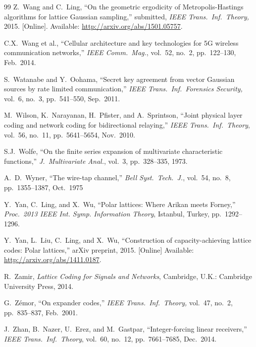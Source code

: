 \documentclass[main.tex]{subfiles}
\begin{document}
\begin{thebibliography}{99}
Z.\ Wang and C.\ Ling, ``On the geometric ergodicity of Metropolis-Hastings algorithms for lattice Gaussian sampling,'' submitted, \emph{IEEE Trans.\ Inf.\ Theory,} 2015. [Online]. Available: \url{http://arxiv.org/abs/1501.05757}.

C.X.\ Wang et al., ``Cellular architecture and key technologies for 5G wireless communication networks,'' \emph{IEEE Comm.\ Mag.}, vol.\ 52, no.\ 2, pp.\ 122--130, Feb.\ 2014.

 S.\ Watanabe and Y.\ Oohama, ``Secret key agreement from vector Gaussian sources by rate limited communication,'' 
 \emph{IEEE Trans.\ Inf.\ Forensics Security,} vol.\ 6, no.\ 3, pp.\ 541--550, Sep.\ 2011.

M.~Wilson, K.~Narayanan, H.~Pfister, and A.~Sprintson, ``Joint physical layer
  coding and network coding for bidirectional relaying,'' 
\emph{IEEE Trans.\ Inf.\ Theory}, vol.~56, no.~11, pp.\ 5641--5654, Nov.\ 2010.

S.J.~Wolfe, ``On the finite series expansion of multivariate characteristic functions,'' 
\emph{J.~Multivariate Anal.}, vol.\ 3, pp.\ 328--335, 1973.

A.~D.~Wyner, ``The wire-tap channel,'' \emph{Bell Syst.\ Tech.\ J.}, vol.~54, no.~8, pp.~1355--1387, Oct.\ 1975

Y.~Yan, C.~Ling, and X.~Wu, ``Polar lattices: Where Arikan meets Forney,''  \emph{Proc.\ 2013 IEEE Int. Symp. Information Theory}, Istanbul, Turkey, pp.\ 1292--1296.

Y.~Yan, L.~Liu, C.~Ling, and X.~Wu, ``Construction of capacity-achieving lattice codes: Polar lattices,''
arXiv preprint, 2015. [Online] Available: \url{http://arxiv.org/abs/1411.0187}.

  R.\ Zamir, \emph{Lattice Coding for Signals and Networks}, Cambridge, U.K.: Cambridge University Press, 2014.
  
G.\ Z\'{e}mor, ``On expander codes,'' \emph{IEEE Trans.\ Inf.\ Theory,} vol.\ 47, no.\ 2, pp.\ 835--837, Feb.\ 2001.

J.\ Zhan, B.\ Nazer, U.\ Erez, and M.\ Gastpar, ``Integer-forcing linear receivers,'' \emph{IEEE Trans.\ Inf.\ Theory}, vol.\ 60, no.\ 12, pp.\ 7661--7685, Dec.\ 2014.


\end{thebibliography}
\end{document}
